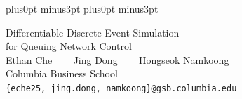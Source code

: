 \documentclass[11pt]{article}
\begin{document}
\abovedisplayskip=8pt plus0pt minus3pt
\belowdisplayskip=8pt plus0pt minus3pt




\begin{center}
  {\huge Differentiable Discrete Event Simulation \vspace{.2cm}
  \\ for Queuing Network Control } \\
  \vspace{.5cm} {\Large Ethan Che ~~~ Jing Dong ~~~ Hongseok Namkoong} \\
  \vspace{.2cm}
  {\large Columbia Business School} \\
  \vspace{.2cm}
  \texttt{\{eche25, jing.dong, namkoong\}@gsb.columbia.edu}
\end{center}


\begin{abstract}%
  
\end{abstract}


















\setlength{\bibsep}{.7em}

\newpage
\appendix



%
% 
% 
% 
% 


\end{document}
